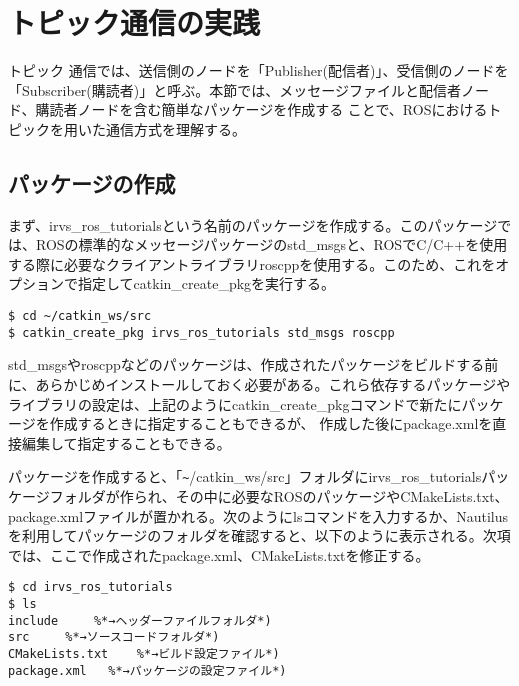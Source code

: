 \section{トピック通信の実践}

トピック  通信では、送信側のノードを「Publisher(配信者)」、受信側のノードを「Subscriber(購読者)」と呼ぶ。本節では、メッセージファイルと配信者ノード、購読者ノードを含む簡単なパッケージを作成する  ことで、ROSにおけるトピックを用いた通信方式を理解する。

\subsection{パッケージの作成}

まず、irvs\_ros\_tutorialsという名前のパッケージを作成する。このパッケージでは、ROSの標準的なメッセージパッケージのstd\_msgsと、ROSでC/C++を使用する際に必要なクライアントライブラリroscppを使用する。このため、これをオプションで指定してcatkin\_create\_pkgを実行する。

\begin{lstlisting}[language=ROS]
$ cd ~/catkin_ws/src
$ catkin_create_pkg irvs_ros_tutorials std_msgs roscpp
\end{lstlisting}

std\_msgsやroscppなどのパッケージは、作成されたパッケージをビルドする前に、あらかじめインストールしておく必要がある。これら依存するパッケージやライブラリの設定は、上記のようにcatkin\_create\_pkgコマンドで新たにパッケージを作成するときに指定することもできるが、  作成した後にpackage.xmlを直接編集して指定することもできる。

パッケージを作成すると、「\verb|~|/catkin\_ws/src」フォルダにirvs\_ros\_tutorialsパッケージフォルダが作られ、その中に必要なROSのパッケージやCMakeLists.txt、 package.xmlファイルが置かれる。次のようにlsコマンドを入力するか、Nautilusを利用してパッケージのフォルダを確認すると、以下のように表示される。次項では、ここで作成されたpackage.xml、CMakeLists.txtを修正する。

\begin{lstlisting}[language=ROS]
$ cd irvs_ros_tutorials
$ ls
include     %*→ヘッダーファイルフォルダ*)
src     %*→ソースコードフォルダ*)
CMakeLists.txt    %*→ビルド設定ファイル*)
package.xml   %*→パッケージの設定ファイル*)
\end{lstlisting}

